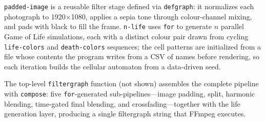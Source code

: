 \documentclass[english,submission]{programming}
\begin{document}
\texttt{padded-image} is a reusable filter stage defined via \texttt{defgraph}: it normalizes each photograph to 1920×1080, applies a sepia tone through colour-channel mixing, and pads with black to fill the frame. \texttt{n-life} uses \texttt{for} to generate $n$ parallel Game of Life simulations, each with a distinct colour pair drawn from cycling \texttt{life-colors} and \texttt{death-colors} sequences; the cell patterns are initialized from a file whose contents the program writes from a CSV of names before rendering, so each iteration builds the cellular automaton from a data-driven seed.

The top-level \texttt{filtergraph} function (not shown) assembles the complete pipeline with \texttt{compose}: five \texttt{for}-generated sub-pipelines---image padding, split, harmonic blending, time-gated final blending, and crossfading---together with the life generation layer, producing a single filtergraph string that FFmpeg executes.

\printbibliography
\end{document}
